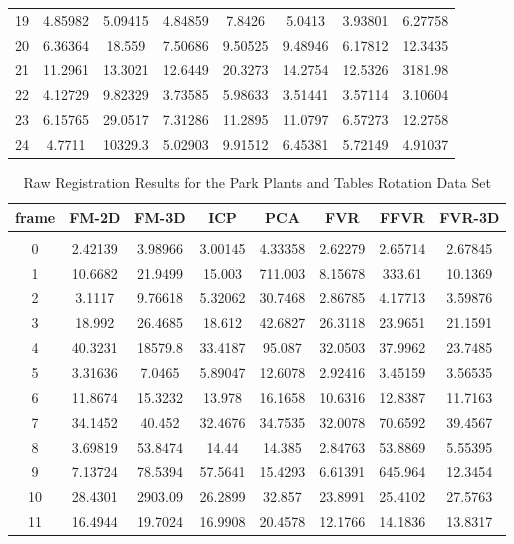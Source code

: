 \begin{center}
\begin{longtable}{cccccccc}
19 & 4.85982 & 5.09415 & 4.84859 & 7.8426 & 5.0413 & 3.93801 & 6.27758\\
20 & 6.36364 & 18.559 & 7.50686 & 9.50525 & 9.48946 & 6.17812 & 12.3435\\
21 & 11.2961 & 13.3021 & 12.6449 & 20.3273 & 14.2754 & 12.5326 & 3181.98\\
22 & 4.12729 & 9.82329 & 3.73585 & 5.98633 & 3.51441 & 3.57114 & 3.10604\\
23 & 6.15765 & 29.0517 & 7.31286 & 11.2895 & 11.0797 & 6.57273 & 12.2758\\
24 & 4.7711 & 10329.3 & 5.02903 & 9.91512 & 6.45381 & 5.72149 & 4.91037\\
\end{longtable}
\end{center}


\begin{center}
\begin{longtable}{cccccccc}
\caption{Raw Registration Results for the Park Plants and Tables Rotation Data Set}
\label{tab:parkplantsandtablesFULL}
\endfirsthead
\endhead
\textbf{frame} & \textbf{FM-2D} & \textbf{FM-3D} & \textbf{ICP} & \textbf{PCA} & \textbf{FVR} & \textbf{FFVR} & \textbf{FVR-3D} \\
\hline \\
0 & 2.42139 & 3.98966 & 3.00145 & 4.33358 & 2.62279 & 2.65714 & 2.67845\\
1 & 10.6682 & 21.9499 & 15.003 & 711.003 & 8.15678 & 333.61 & 10.1369\\
2 & 3.1117 & 9.76618 & 5.32062 & 30.7468 & 2.86785 & 4.17713 & 3.59876\\
3 & 18.992 & 26.4685 & 18.612 & 42.6827 & 26.3118 & 23.9651 & 21.1591\\
4 & 40.3231 & 18579.8 & 33.4187 & 95.087 & 32.0503 & 37.9962 & 23.7485\\
5 & 3.31636 & 7.0465 & 5.89047 & 12.6078 & 2.92416 & 3.45159 & 3.56535\\
6 & 11.8674 & 15.3232 & 13.978 & 16.1658 & 10.6316 & 12.8387 & 11.7163\\
7 & 34.1452 & 40.452 & 32.4676 & 34.7535 & 32.0078 & 70.6592 & 39.4567\\
8 & 3.69819 & 53.8474 & 14.44 & 14.385 & 2.84763 & 53.8869 & 5.55395\\
9 & 7.13724 & 78.5394 & 57.5641 & 15.4293 & 6.61391 & 645.964 & 12.3454\\
10 & 28.4301 & 2903.09 & 26.2899 & 32.857 & 23.8991 & 25.4102 & 27.5763\\
11 & 16.4944 & 19.7024 & 16.9908 & 20.4578 & 12.1766 & 14.1836 & 13.8317\\

\end{longtable}
\end{center}
